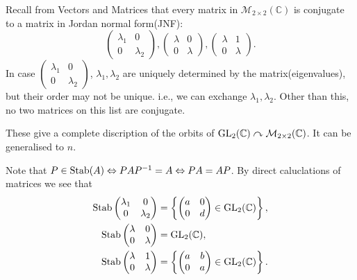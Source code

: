 \documentclass[10pt]{article}
\begin{document}
    \begin{example}
        Recall from Vectors and Matrices that every matrix in $ \mathcal{M}_{2\times 2}(\mathbb{C}) $ is conjugate to a matrix in Jordan normal form(JNF):
        \[
            \begin{pmatrix}
                \lambda_1&0\\
                0&\lambda_2
            \end{pmatrix},
            \begin{pmatrix}
                \lambda&0\\
                0&\lambda
            \end{pmatrix},
            \begin{pmatrix}
                \lambda&1\\
                0&\lambda
            \end{pmatrix}.
        \]
        In case $\begin{pmatrix}
            \lambda_1&0\\
            0&\lambda_2
        \end{pmatrix}$, $ \lambda_1,\lambda_2 $ are uniquely determined by the matrix(eigenvalues), but their order may not be unique. i.e., we can exchange $ \lambda_1,\lambda_2 $. Other than this, no two matrices on this list are conjugate.

        These give a complete discription of the orbits of $ \mathrm{GL}_2({\mathbb{C}})\curvearrowright \mathcal{M}_{2\times 2}(\mathbb{C}) $. It can be generalised to $n$.

        Note that $ P\in \operatorname{Stab}(A)\Leftrightarrow PAP^{-1}=A \Leftrightarrow PA=AP $. By direct caluclations of matrices we see that 
        \begin{align*}
            \operatorname{Stab}\begin{pmatrix}
                \lambda_1&0\\
                0&\lambda_2
            \end{pmatrix} &= \left\{ \begin{pmatrix}
                a&0\\
                0&d
            \end{pmatrix}\in \mathrm{GL}_2({\mathbb{C}}) \right\},\\
            \operatorname{Stab} \begin{pmatrix}
                \lambda&0\\
                0&\lambda
            \end{pmatrix}&= \mathrm{GL}_2({\mathbb{C}}),\\
            \operatorname{Stab}\begin{pmatrix}
                \lambda&1\\
                0&\lambda
            \end{pmatrix}&=\left\{ \begin{pmatrix}
                a&b\\
                0&a
            \end{pmatrix}\in \mathrm{GL}_2({\mathbb{C}}) \right\}.
        \end{align*}
    \end{example}
\end{document}
